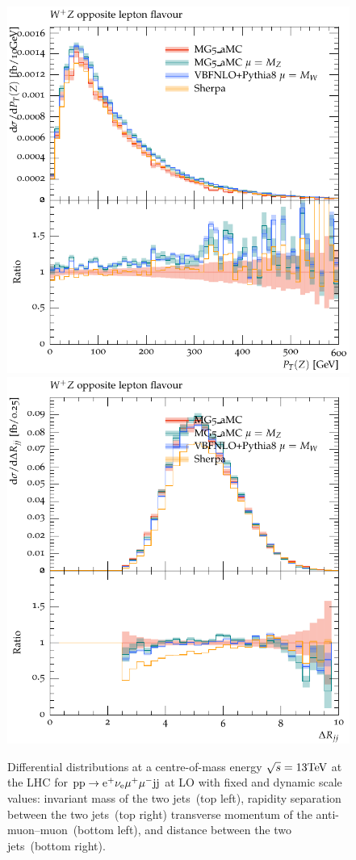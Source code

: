 \documentclass[11pt]{cernrep}
\begin{document}
\begin{figure}[htbp]
\begin{center}
   \includegraphics[scale=0.5]{figs/WpZ_OF_ZPt}
   \includegraphics[scale=0.5]{figs/WpZ_OF_dRjj}
\caption{Differential distributions at a centre-of-mass energy $\sqrt{s}=13{\rm TeV}$ at the LHC for ${\rm p} {\rm p}
  \to {\rm e}^+  \nu_{\rm e}  \mu^+ \mu^- {\rm j} {\rm j}$ at LO with fixed and dynamic scale values:  
                invariant mass of the two jets~(top left),
                rapidity separation between the two jets~(top right)
                transverse momentum of the anti-muon--muon~(bottom left), and
                distance between the two jets~(bottom right).}
\label{vbs_fig_shower_4a}
\end{center}
\end{figure}
\end{document}

